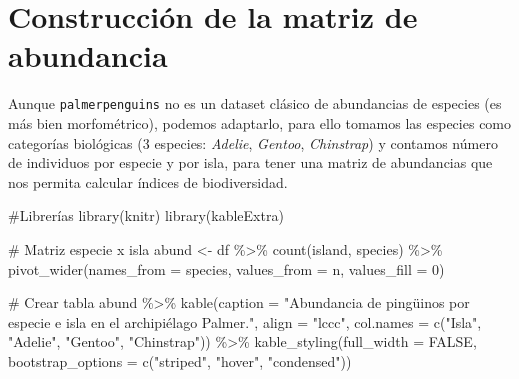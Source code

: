 \documentclass[
  spanish,
  11pt,
  a4paper,
  DIV=11,
  numbers=noendperiod]{scrartcl}
\newenvironment{Shaded}{\begin{snugshade}}{\end{snugshade}}
\newcommand{\AttributeTok}[1]{\textcolor[rgb]{0.40,0.45,0.13}{#1}}
\newcommand{\CommentTok}[1]{\textcolor[rgb]{0.37,0.37,0.37}{#1}}
\newcommand{\ConstantTok}[1]{\textcolor[rgb]{0.56,0.35,0.01}{#1}}
\newcommand{\DecValTok}[1]{\textcolor[rgb]{0.68,0.00,0.00}{#1}}
\newcommand{\FunctionTok}[1]{\textcolor[rgb]{0.28,0.35,0.67}{#1}}
\newcommand{\NormalTok}[1]{\textcolor[rgb]{0.00,0.23,0.31}{#1}}
\newcommand{\OtherTok}[1]{\textcolor[rgb]{0.00,0.23,0.31}{#1}}
\newcommand{\SpecialCharTok}[1]{\textcolor[rgb]{0.37,0.37,0.37}{#1}}
\newcommand{\StringTok}[1]{\textcolor[rgb]{0.13,0.47,0.30}{#1}}
\begin{document}
\section{Construcción de la matriz de
abundancia}\label{construcciuxf3n-de-la-matriz-de-abundancia}

Aunque \texttt{palmerpenguins} no es un dataset clásico de abundancias
de especies (es más bien morfométrico), podemos adaptarlo, para ello
tomamos las especies como categorías biológicas (3 especies:
\emph{Adelie}, \emph{Gentoo}, \emph{Chinstrap}) y contamos número de
individuos por especie y por isla, para tener una matriz de abundancias
que nos permita calcular índices de biodiversidad.

\begin{Shaded}
\begin{Highlighting}[numbers=left,,]
\CommentTok{\#Librerías}
\FunctionTok{library}\NormalTok{(knitr)}
\FunctionTok{library}\NormalTok{(kableExtra)}
\end{Highlighting}
\end{Shaded}

\begin{Shaded}
\begin{Highlighting}[numbers=left,,]
\CommentTok{\# Matriz especie x isla}
\NormalTok{abund }\OtherTok{\textless{}{-}}\NormalTok{ df }\SpecialCharTok{\%\textgreater{}\%}
  \FunctionTok{count}\NormalTok{(island, species) }\SpecialCharTok{\%\textgreater{}\%}
  \FunctionTok{pivot\_wider}\NormalTok{(}\AttributeTok{names\_from =}\NormalTok{ species, }\AttributeTok{values\_from =}\NormalTok{ n, }\AttributeTok{values\_fill =} \DecValTok{0}\NormalTok{)}

\CommentTok{\# Crear tabla}
\NormalTok{abund }\SpecialCharTok{\%\textgreater{}\%}
  \FunctionTok{kable}\NormalTok{(}\AttributeTok{caption =} \StringTok{"Abundancia de pingüinos por especie e isla }
\StringTok{        en el archipiélago Palmer."}\NormalTok{,}
        \AttributeTok{align =} \StringTok{"lccc"}\NormalTok{,}
        \AttributeTok{col.names =} \FunctionTok{c}\NormalTok{(}\StringTok{"Isla"}\NormalTok{, }\StringTok{"Adelie"}\NormalTok{, }\StringTok{"Gentoo"}\NormalTok{, }\StringTok{"Chinstrap"}\NormalTok{)) }\SpecialCharTok{\%\textgreater{}\%}
  \FunctionTok{kable\_styling}\NormalTok{(}\AttributeTok{full\_width =} \ConstantTok{FALSE}\NormalTok{, }\AttributeTok{bootstrap\_options =} \FunctionTok{c}\NormalTok{(}\StringTok{"striped"}\NormalTok{, }
      \StringTok{"hover"}\NormalTok{, }\StringTok{"condensed"}\NormalTok{))}
\end{Highlighting}
\end{Shaded}
\end{document}
